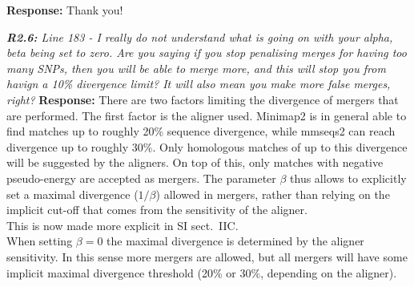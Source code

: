 \documentclass[aps,rmp,onecolumn]{revtex4-1}
\newcommand{\reviewer}[2]{{\it \textbf{#1:} #2\vskip 5mm}}
\newcommand{\response}[1]{{{\color{response}\textbf{Response:} #1}}\vskip 5mm}
\newcommand{\SIalgo}{II}
\begin{document}
\response{Thank you!}

\reviewer{R2.6}{Line 183 - I really do not understand what is going on with your alpha, beta being set to zero. Are you saying if you stop penalising merges for having too many SNPs, then you will be able to merge more, and this will stop you from havign a 10\% divergence limit? It will also mean you make more false merges, right?}
\response{There are two factors limiting the divergence of mergers that are performed. The first factor is the aligner used. Minimap2 is in general able to find matches up to roughly 20\% sequence divergence, while mmseqs2 can reach divergence up to roughly 30\%. Only homologous matches of up to this divergence will be suggested by the aligners.
On top of this, only matches with negative pseudo-energy are accepted as mergers.
The parameter $\beta$ thus allows to explicitly set a maximal divergence ($1/\beta$) allowed in mergers, rather than relying on the implicit cut-off that comes from the sensitivity of the aligner. \\
This is now made more explicit in SI sect.~{\SIalgo}C.\\
When setting $\beta = 0$ the maximal divergence is determined by the aligner sensitivity. In this sense more mergers are allowed, but all mergers will have some implicit maximal divergence threshold (20\% or 30\%, depending on the aligner).}
\end{document}
